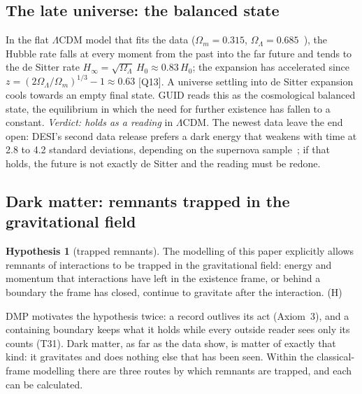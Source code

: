 \documentclass[11pt,a4paper]{article}
\theoremstyle{definition}
\newtheorem{hypothesis}{Hypothesis}
\theoremstyle{remark}
\newcommand{\chk}[1]{\textsf{[#1]}}
\newcommand{\tagH}{\textsf{(H)}}
\theoremstyle{definition}
\begin{document}
\subsection{The late universe: the balanced state}

In the flat $\Lambda$CDM model that fits the data ($\Omega_m=0.315$, $\Omega_\Lambda=0.685$~\cite{planck18}), the Hubble rate falls at every
moment from the past into the far future and tends to the de Sitter rate $H_\infty=\sqrt{\Omega_\Lambda}\,H_0\approx0.83\,H_0$; the expansion
has accelerated since $z=(2\Omega_\Lambda/\Omega_m)^{1/3}-1\approx0.63$ \chk{Q13}. A universe settling into de Sitter expansion cools towards
an empty final state. GUID reads this as the cosmological balanced state, the equilibrium in which the need for further existence has
fallen to a constant. \emph{Verdict: holds as a reading} in $\Lambda$CDM. The newest data leave the end open: DESI's second data release
prefers a dark energy that weakens with time at 2.8 to 4.2 standard deviations, depending on the supernova sample~\cite{desi2}; if that holds,
the future is not exactly de Sitter and the reading must be redone.

\subsection{Dark matter: remnants trapped in the gravitational field}\label{sec:darkmatter}

\begin{hypothesis}[trapped remnants]\label{h:remnant}
The modelling of this paper explicitly allows remnants of interactions to be trapped in the gravitational field: energy and momentum that
interactions have left in the existence frame, or behind a boundary the frame has closed, continue to gravitate after the interaction.
\tagH
\end{hypothesis}

DMP motivates the hypothesis twice: a record outlives its act (Axiom~3), and a containing boundary keeps what it holds while every outside
reader sees only its counts (T31). Dark matter, as far as the data show, is matter of exactly that kind: it gravitates and does nothing
else that has been seen. Within the classical-frame modelling there are three routes by which remnants are trapped, and each can be
calculated.
\end{document}
